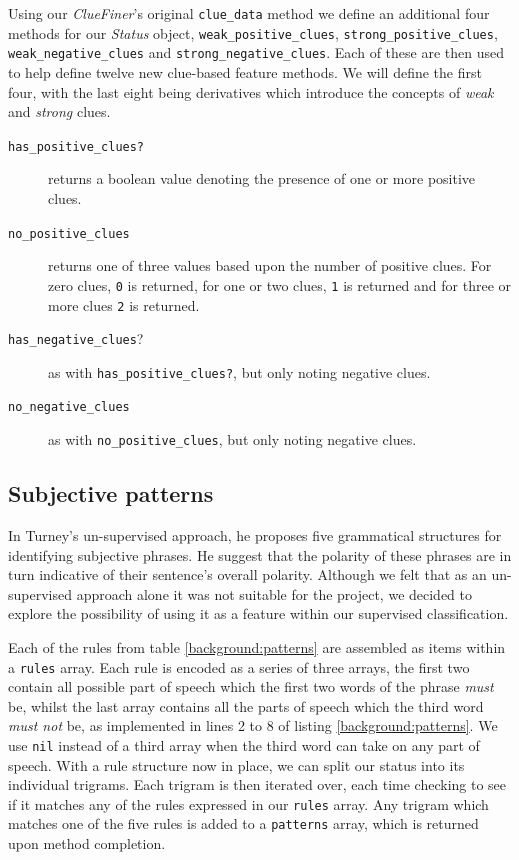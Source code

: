 Using our \emph{ClueFiner}'s original \texttt{clue\_data} method we define an additional four methods for our \emph{Status} object, \texttt{weak\-\_positive\-\_clues}, \texttt{strong\-\_positive\-\_clues}, \texttt{weak\-\_negative\-\_clues} and \texttt{strong\-\_negative\-\_clues}. Each of these are then used to help define twelve new clue-based feature methods. We will define the first four, with the last eight being derivatives which introduce the concepts of \emph{weak} and \emph{strong} clues.

\begin{description}
	\item [\texttt{has\_positive\_clues?}] returns a boolean value denoting the presence of one or more positive clues.
	\item [\texttt{no\_positive\_clues}] returns one of three values based upon the number of positive clues. For zero clues, \texttt{0} is returned, for one or two clues, \texttt{1} is returned and for three or more clues \texttt{2} is returned.
	\item [\texttt{has\_negative\_clues}?] as with \texttt{has\-\_positive\-\_clues?}, but only noting negative clues.
	\item [\texttt{no\_negative\_clues}] as with \texttt{no\-\_positive\-\_clues}, but only noting negative clues.
\end{description}

\subsection{Subjective patterns}

In Turney's \cite{Turney:2002vv} un-supervised approach, he proposes five grammatical structures for identifying subjective phrases. He suggest that the polarity of these phrases are in turn indicative of their sentence's overall polarity. Although we felt that as an un-supervised approach alone it was not suitable for the project, we decided to explore the possibility of using it as a feature within our supervised classification.

Each of the rules from table \ref{background:patterns} are assembled as items within a \texttt{rules} array. Each rule is encoded as a series of three arrays, the first two contain all possible part of speech which the first two words of the phrase \emph{must} be, whilst the last array contains all the parts of speech which the third word \emph{must not} be, as implemented in lines 2 to 8 of listing \ref{background:patterns}. We use \texttt{nil} instead of a third array when the third word can take on any part of speech. With a rule structure now in place, we can split our status into its individual trigrams. Each trigram is then iterated over, each time checking to see if it matches any of the rules expressed in our \texttt{rules} array. Any trigram which matches one of the five rules is added to a \texttt{patterns} array, which is returned upon method completion.

